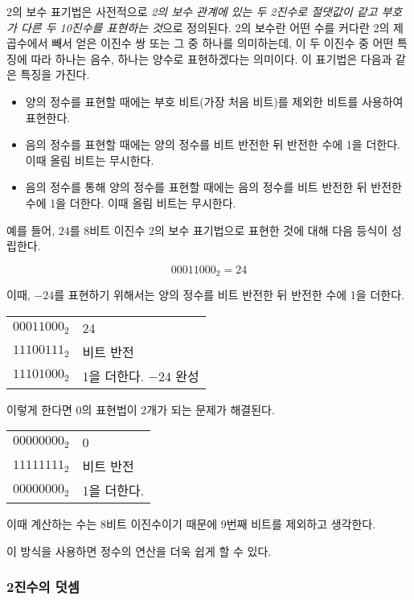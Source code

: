 \documentclass{article}
\begin{document}
2의 보수 표기법은 사전적으로 \textit{2의 보수 관계에 있는 두 2진수로 절댓값이 같고 부호가
다른 두 10진수를 표현하는 것}으로 정의된다. 2의 보수란 어떤 수를 커다란 2의 제곱수에서
빼서 얻은 이진수 쌍 또는 그 중 하나를 의미하는데, 이 두 이진수 중 어떤 특징에 따라
하나는 음수, 하나는 양수로 표현하겠다는 의미이다. 이 표기법은 다음과 같은 특징을 가진다.

\begin{itemize}
    \item 양의 정수를 표현할 때에는 부호 비트(가장 처음 비트)를 제외한 비트를 사용하여 표현한다.
    \item 음의 정수를 표현할 때에는 양의 정수를 비트 반전한 뒤 반전한 수에 1을 더한다. 이때 올림 비트는 무시한다.
    \item 음의 정수를 통해 양의 정수를 표현할 때에는 음의 정수를 비트 반전한 뒤 반전한 수에 1을 더한다. 이때 올림 비트는 무시한다.
\end{itemize}

예를 들어, $24$를 8비트 이진수 2의 보수 표기법으로 표현한 것에 대해 다음 등식이 성립한다.

$$
00011000_2 = 24
$$

이때, $-24$를 표현하기 위해서는 양의 정수를 비트 반전한 뒤 반전한 수에 1을 더한다.

\begin{center}
    \begin{tabular}{rl}
        $00011000_2$ & 24 \\
        $11100111_2$ & 비트 반전 \\
        $11101000_2$ & 1을 더한다. $-24$ 완성
    \end{tabular}
\end{center}

이렇게 한다면 0의 표현법이 2개가 되는 문제가 해결된다.

\begin{center}
    \begin{tabular}{rl}
        $00000000_2$ & 0 \\
        $11111111_2$ & 비트 반전 \\
        $00000000_2$ & 1을 더한다.
    \end{tabular}
\end{center}

이때 계산하는 수는 8비트 이진수이기 때문에 9번째 비트를 제외하고 생각한다.

이 방식을 사용하면 정수의 연산을 더욱 쉽게 할 수 있다.

\subsubsection{2진수의 덧셈}
\end{document}
